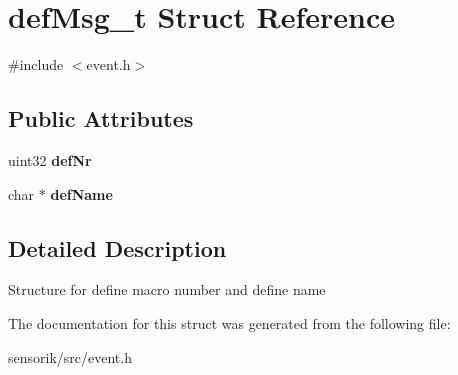 \hypertarget{structdef_msg__t}{}\section{def\+Msg\+\_\+t Struct Reference}
\label{structdef_msg__t}


{\ttfamily \#include $<$event.\+h$>$}

\subsection*{Public Attributes}
\begin{DoxyCompactItemize}
\item 
\mbox{\label{structdef_msg__t_ab8dff4621643b1ecdb577a9da2c2846d}} 
uint32 {\bfseries def\+Nr}
\item 
\mbox{\label{structdef_msg__t_a0a28ff84793de35a04096e07f794b4b0}} 
char $\ast$ {\bfseries def\+Name}
\end{DoxyCompactItemize}


\subsection{Detailed Description}
Structure for define macro number and define name 

The documentation for this struct was generated from the following file\+:\begin{DoxyCompactItemize}
\item 
sensorik/src/event.\+h\end{DoxyCompactItemize}
